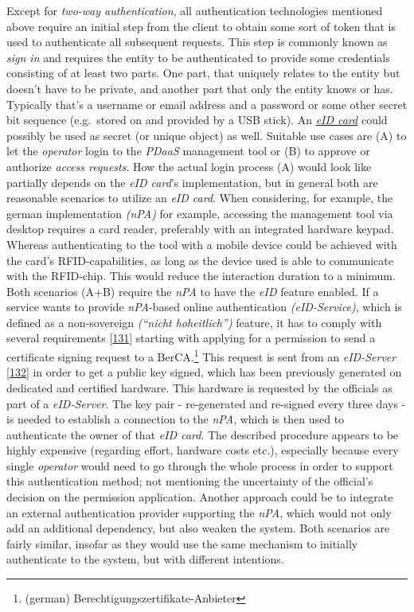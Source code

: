 \documentclass[12pt,english,a4paper,titlepage,cleardoublepage=empty,dottedtoc]{report}
\begin{document}
Except for \emph{two-way authentication}, all authentication
technologies mentioned above require an initial step from the client to
obtain some sort of token that is used to authenticate all subsequent
requests. This step is commonly known as \emph{sign in} and requires the
entity to be authenticated to provide some credentials consisting of at
least two parts. One part, that uniquely relates to the entity but
doesn't have to be private, and another part that only the entity knows
or has. Typically that's a username or email address and a password or
some other secret bit sequence (e.g.~stored on and provided by a USB
stick). An \emph{\protect\hyperlink{def--eid-card}{eID card}} could
possibly be used as secret (or unique object) as well. Suitable use
cases are (A) to let the \emph{operator} login to the \emph{PDaaS}
management tool or (B) to approve or authorize \emph{access requests}.
How the actual login process (A) would look like partially depends on
the \emph{eID card}'s implementation, but in general both are reasonable
scenarios to utilize an \emph{eID card}. When considering, for example,
the german implementation \emph{(nPA)} for example, accessing the
management tool via desktop requires a card reader, preferably with an
integrated hardware keypad. Whereas authenticating to the tool with a
mobile device could be achieved with the card's RFID-capabilities, as
long as the device used is able to communicate with the RFID-chip. This
would reduce the interaction duration to a minimum. Both scenarios (A+B)
require the \emph{nPA} to have the \emph{eID} feature enabled. If a
service wants to provide \emph{nPA}-based online authentication
\emph{(eID-Service)}, which is defined as a non-sovereign \emph{(``nicht
hoheitlich'')} feature, it has to comply with several requirements
{[}\protect\hyperlink{ref-web_bsi-spec_eid}{131}{]} starting with
applying for a permission to send a certificate signing request to a
BerCA.\footnote{(german) Berechtigungszertifikate-Anbieter} This request
is sent from an \emph{eID-Server}
{[}\protect\hyperlink{ref-web_2017_npa-eid-server}{132}{]} in order to
get a public key signed, which has been previously generated on
dedicated and certified hardware. This hardware is requested by the
officials as part of a \emph{eID-Server}. The key pair - re-generated
and re-signed every three days - is needed to establish a connection to
the \emph{nPA}, which is then used to authenticate the owner of that
\emph{eID card}. The described procedure appears to be highly expensive
(regarding effort, hardware costs etc.), especially because every single
\emph{operator} would need to go through the whole process in order to
support this authentication method; not mentioning the uncertainty of
the official's decision on the permission application. Another approach
could be to integrate an external authentication provider supporting the
\emph{nPA}, which would not only add an additional dependency, but also
weaken the system. Both scenarios are fairly similar, insofar as they
would use the same mechanism to initially authenticate to the system,
but with different intentions.
\end{document}
